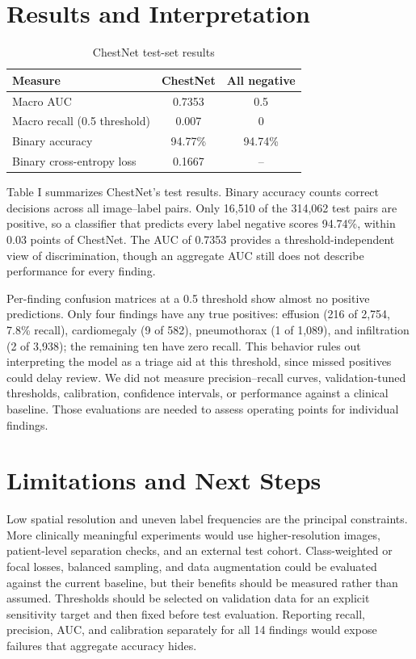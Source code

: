 \documentclass[conference]{IEEEtran}
\begin{document}
\section{Results and Interpretation}
\begin{table}[ht]
\caption{ChestNet test-set results}
\centering
\begin{tabular}{lcc}
\hline
Measure & ChestNet & All negative \\
\hline
Macro AUC & 0.7353 & 0.5 \\
Macro recall (0.5 threshold) & 0.007 & 0 \\
Binary accuracy & 94.77\% & 94.74\% \\
Binary cross-entropy loss & 0.1667 & -- \\
\hline
\end{tabular}
\end{table}
Table I summarizes ChestNet's test results. Binary accuracy counts correct decisions across all image--label pairs. Only 16,510 of the 314,062 test pairs are positive, so a classifier that predicts every label negative scores 94.74\%, within 0.03 points of ChestNet. The AUC of 0.7353 provides a threshold-independent view of discrimination, though an aggregate AUC still does not describe performance for every finding.

Per-finding confusion matrices at a 0.5 threshold show almost no positive predictions. Only four findings have any true positives: effusion (216 of 2,754, 7.8\% recall), cardiomegaly (9 of 582), pneumothorax (1 of 1,089), and infiltration (2 of 3,938); the remaining ten have zero recall. This behavior rules out interpreting the model as a triage aid at this threshold, since missed positives could delay review. We did not measure precision--recall curves, validation-tuned thresholds, calibration, confidence intervals, or performance against a clinical baseline. Those evaluations are needed to assess operating points for individual findings.

\balance
\section{Limitations and Next Steps}
Low spatial resolution and uneven label frequencies are the principal constraints. More clinically meaningful experiments would use higher-resolution images, patient-level separation checks, and an external test cohort. Class-weighted or focal losses, balanced sampling, and data augmentation could be evaluated against the current baseline, but their benefits should be measured rather than assumed. Thresholds should be selected on validation data for an explicit sensitivity target and then fixed before test evaluation. Reporting recall, precision, AUC, and calibration separately for all 14 findings would expose failures that aggregate accuracy hides.
\end{document}
